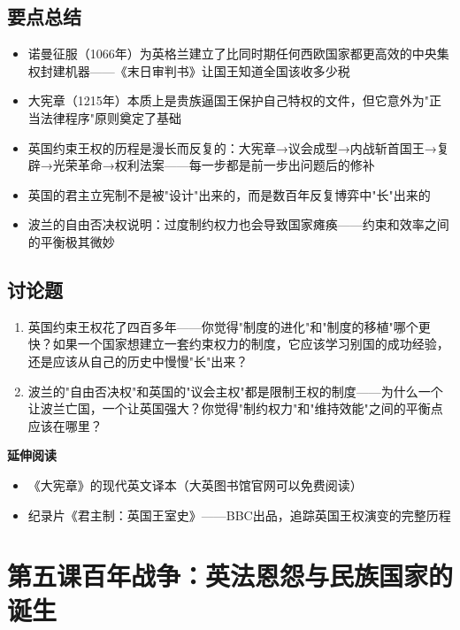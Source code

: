 \documentclass[a4paper,12pt]{ctexart}
\begin{document}
\subsection*{要点总结}
\begin{itemize}
  \item 诺曼征服（1066年）为英格兰建立了比同时期任何西欧国家都更高效的中央集权封建机器——《末日审判书》让国王知道全国该收多少税
  \item 大宪章（1215年）本质上是贵族逼国王保护自己特权的文件，但它意外为"正当法律程序"原则奠定了基础
  \item 英国约束王权的历程是漫长而反复的：大宪章→议会成型→内战斩首国王→复辟→光荣革命→权利法案——每一步都是前一步出问题后的修补
  \item 英国的君主立宪制不是被"设计"出来的，而是数百年反复博弈中"长"出来的
  \item 波兰的自由否决权说明：过度制约权力也会导致国家瘫痪——约束和效率之间的平衡极其微妙
\end{itemize}

\subsection*{讨论题}
\begin{enumerate}
  \item 英国约束王权花了四百多年——你觉得"制度的进化"和"制度的移植"哪个更快？如果一个国家想建立一套约束权力的制度，它应该学习别国的成功经验，还是应该从自己的历史中慢慢"长"出来？
  \item 波兰的"自由否决权"和英国的"议会主权"都是限制王权的制度——为什么一个让波兰亡国，一个让英国强大？你觉得"制约权力"和"维持效能"之间的平衡点应该在哪里？
\end{enumerate}

\vspace{0.3cm}
\textcolor{blue!70!black}{\textbf{延伸阅读}}
\begin{itemize}
  \item 《大宪章》的现代英文译本（大英图书馆官网可以免费阅读）
  \item 纪录片《君主制：英国王室史》——BBC出品，追踪英国王权演变的完整历程
\end{itemize}

\newpage

\section{\textcolor{orange!80!black}{第五课\quad 百年战争：英法恩怨与民族国家的诞生}}
\end{document}
